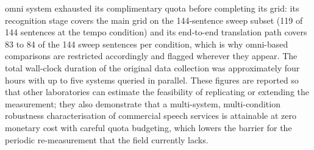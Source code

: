 omni system exhausted its complimentary quota before completing its grid:
its recognition stage covers the main grid on the 144-sentence sweep subset
(119 of 144 sentences at the tempo condition) and its end-to-end
translation path covers 83 to 84 of the 144 sweep sentences per condition,
which is why omni-based comparisons are restricted accordingly and flagged
wherever they appear. The total wall-clock duration of the original data
collection was approximately four hours with up to five systems queried in
parallel. These figures are reported so that other laboratories can
estimate the feasibility of replicating or extending the measurement; they
also demonstrate that a multi-system, multi-condition robustness
characterisation of commercial speech services is attainable at zero
monetary cost with careful quota budgeting, which lowers the barrier for
the periodic re-measurement that the field currently lacks.

